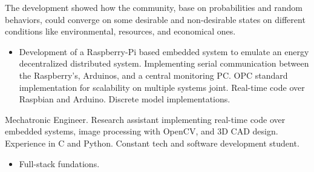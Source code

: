 \documentclass[paper=a4,fontsize=10pt,ragged2e,withhyper]{altacv}%
\begin{document}
\begin{paracol}{2}
\begin{itemize}
The development showed how the community, base on probabilities and random behaviors, could converge on some desirable and non{-}desirable states on different conditions like environmental, resources, and economical ones. 
\end{itemize}
\divider
{}
\begin{itemize}
 \item Development of a Raspberry{-}Pi based embedded system to emulate an energy decentralized distributed system. Implementing serial communication between the Raspberry's, Arduinos, and a central monitoring PC. OPC standard implementation for scalability on multiple systems joint. Real{-}time code over Raspbian and Arduino. Discrete model implementations.
\end{itemize}%

\switchcolumn%

Mechatronic Engineer. Research assistant implementing real-time code over embedded systems, image processing with OpenCV, and 3D CAD design. Experience in C and Python. Constant tech and software development student.%

%

\divider
{}
\divider
{}
\begin{itemize}
 \item Full{-}stack fundations. 
\end{itemize}%

\end{paracol}%
\end{document}
